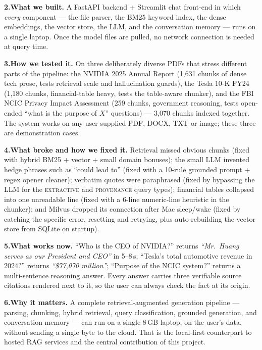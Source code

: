 \documentclass[11pt,a4paper]{article}
\begin{document}
\textbf{2.\;What we built.}\;
A FastAPI backend + Streamlit chat front-end in which \emph{every}
component --- the file parser, the BM25 keyword index, the dense
embeddings, the vector store, the LLM, and the conversation memory ---
runs on a single laptop. Once the model files are pulled, no network
connection is needed at query time.

\textbf{3.\;How we tested it.}\;
On three deliberately diverse PDFs that stress different parts of the
pipeline: the NVIDIA 2025 Annual Report (1{,}631 chunks of dense tech
prose, tests retrieval scale and hallucination guards), the Tesla 10-K
FY24 (1{,}180 chunks, financial-table heavy, tests the table-aware
chunker), and the FBI NCIC Privacy Impact Assessment (259 chunks,
government reasoning, tests open-ended ``what is the purpose of $X$''
questions) --- 3{,}070 chunks indexed together. The system works on any
user-supplied PDF, DOCX, TXT or image; these three are demonstration
cases.

\textbf{4.\;What broke and how we fixed it.}\;
Retrieval missed obvious chunks (fixed with hybrid BM25 + vector +
small domain bonuses); the small LLM invented hedge phrases such as
``could lead to'' (fixed with a 10-rule grounded prompt + regex opener
cleaner); verbatim quotes were paraphrased (fixed by bypassing the LLM
for the \textsc{extractive} and \textsc{provenance} query types);
financial tables collapsed into one unreadable line (fixed with a
6-line numeric-line heuristic in the chunker); and Milvus dropped its
connection after Mac sleep/wake (fixed by catching the specific error,
resetting and retrying, plus auto-rebuilding the vector store from
SQLite on startup).

\textbf{5.\;What works now.}\;
``Who is the CEO of NVIDIA?'' returns
\textit{``Mr.\ Huang serves as our President and CEO''} in 5--8\,s;
``Tesla's total automotive revenue in 2024?'' returns
\textit{``\$77{,}070 million''}; ``Purpose of the NCIC system?'' returns
a multi-sentence reasoning answer. Every answer carries three verifiable
source citations rendered next to it, so the user can always check the
fact at its origin.

\textbf{6.\;Why it matters.}\;
A complete retrieval-augmented generation pipeline --- parsing,
chunking, hybrid retrieval, query classification, grounded generation,
and conversation memory --- can run on a single 8\,GB laptop, on the
user's data, without sending a single byte to the cloud. That is the
local-first counterpart to hosted RAG services and the central
contribution of this project.
\end{document}
